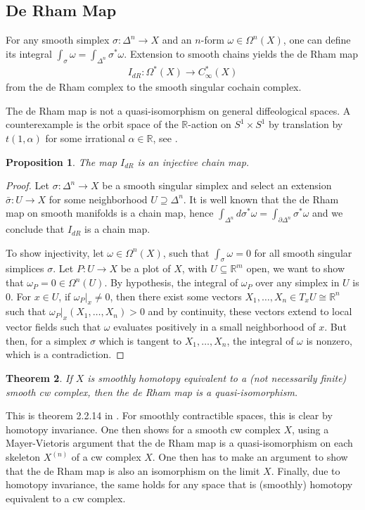 \documentclass{scrartcl}
\theoremstyle{plain}
\newtheorem{theorem}{Theorem}[section]
\newtheorem{proposition}[theorem]{Proposition}
\theoremstyle{definition}
\newcommand{\R}{\mathbb R}
\renewcommand{\subset}{\subseteq}
\renewcommand{\supset}{\supseteq}
\newcommand{\iso}{\cong}
\begin{document}
\subsection{De Rham Map} For any smooth simplex $\sigma\colon \Delta^n\to X$ and an $n$-form $\omega\in\Omega^n(X)$, one can define its integral $\int_{\sigma}\omega = \int_{\Delta^n}\sigma^*\omega$.
Extension to smooth chains yields the de Rham map 
\begin{align*}
    I_{dR}\colon \Omega^*(X)\to C^*_\infty(X)
\end{align*}
from the de Rham complex to the smooth singular cochain complex.

The de Rham map is not a quasi-isomorphism on general diffeological spaces. A counterexample is the orbit space of the $\R$-action on $S^1\times S^1$ by translation by $t(1, \alpha)$ for some irrational $\alpha\in \R$, see \cite{iglesias2013diffeology}.

\begin{proposition}\label{thm:deRham-properties}
    The map $I_{dR}$ is an injective chain map.
\end{proposition}
\begin{proof}
    Let $\sigma\colon\Delta^n\to X$ be a smooth singular simplex and select an extension $\bar \sigma\colon U\to X$ for some neighborhood $U\supset \Delta^n$. It is well known that the de Rham map on smooth manifolds is a chain map, hence $\int_{\Delta^n}d\sigma^*\omega = \int_{\partial\Delta^n}\sigma^*\omega$ and we conclude that $I_{dR}$ is a chain map. 
    
    To show injectivity, let $\omega\in \Omega^n(X)$, such that $\int_\sigma \omega = 0$ for all smooth singular simplices $\sigma$. Let $P\colon U\to X$ be a plot of $X$, with $U\subset \R^m$ open, we want to show that $\omega_P = 0\in\Omega^n(U)$. By hypothesis, the integral of $\omega_P$ over any simplex in $U$ is $0$. For $x\in U$, if $\omega_P|_x\neq 0$, then there exist some vectors $X_1,\dots, X_n\in T_xU \iso \R^n$ such that $\omega_P|_x(X_1, \dots, X_n) > 0$ and by continuity, these vectors extend to local vector fields such that $\omega$ evaluates positively in a small neighborhood of $x$. But then, for a simplex $\sigma$ which is tangent to $X_1, \dots, X_n$, the integral of $\omega$ is nonzero, which is a contradiction. 
\end{proof}

\begin{theorem}
    If $X$ is smoothly homotopy equivalent to a (not necessarily finite) smooth cw complex, then the de Rham map is a quasi-isomorphism.
\end{theorem}
This is theorem 2.2.14 in \cite{gurer2014topologie}. For smoothly contractible spaces, this is clear by homotopy invariance. One then shows for a smooth cw complex $X$, using a Mayer-Vietoris argument that the de Rham map is a quasi-isomorphism on each skeleton $X^{(n)}$ of a cw complex $X$. One then has to make an argument to show that the de Rham map is also an isomorphism on the limit $X$. Finally, due to homotopy invariance, the same holds for any space that is (smoothly) homotopy equivalent to a cw complex.
\end{document}

